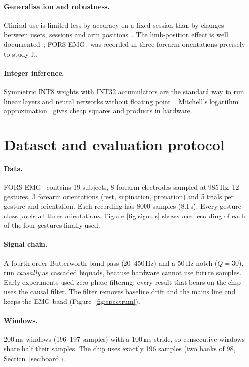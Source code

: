 \documentclass[11pt,a4paper]{article}
\begin{document}
\paragraph{Generalisation and robustness.} Clinical use is limited less by accuracy on a fixed session than by
changes between users, sessions and arm positions~\cite{scheme2011}. The limb-position effect is
well documented~\cite{fougner2011}; FORS-EMG~\cite{forsemg} was recorded in three forearm orientations
precisely to study it.
\paragraph{Integer inference.} Symmetric INT8 weights with INT32 accumulators are the standard way to run
linear layers and neural networks without floating point~\cite{jacob2018}. Mitchell's logarithm
approximation~\cite{mitchell1962} gives cheap squares and products in hardware.

\section{Dataset and evaluation protocol}\label{sec:protocol}
\paragraph{Data.} FORS-EMG~\cite{forsemg} contains 19 subjects, 8 forearm electrodes sampled at 985\,Hz,
12 gestures, 3 forearm orientations (rest, supination, pronation) and 5 trials per gesture and orientation.
Each recording has 8000 samples (8.1\,s). Every gesture class pools all three orientations.
Figure~\ref{fig:signals} shows one recording of each of the four gestures finally used.

\paragraph{Signal chain.} A fourth-order Butterworth band-pass (20--450\,Hz) and a 50\,Hz notch ($Q=30$),
run \emph{causally} as cascaded biquads, because hardware cannot use future samples. Early experiments used
zero-phase filtering; every result that bears on the chip uses the causal filter. The filter removes baseline
drift and the mains line and keeps the EMG band (Figure~\ref{fig:spectrum}).

\paragraph{Windows.} 200\,ms windows (196--197 samples) with a 100\,ms stride, so consecutive windows share
half their samples. The chip uses exactly 196 samples (two banks of 98, Section~\ref{sec:board}).
\end{document}
